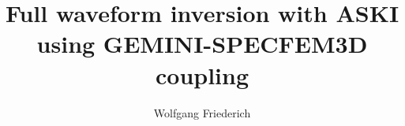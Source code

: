 \documentclass[12pt,a4paper]{article}
\begin{document}
\setlength{\parindent}{0cm}
\addtolength{\parskip}{0.1cm}
\title{Full waveform inversion with ASKI using GEMINI-SPECFEM3D coupling}
\author{Wolfgang Friederich}
\maketitle
\newpage
\tableofcontents
\newpage









%
\end{document}
